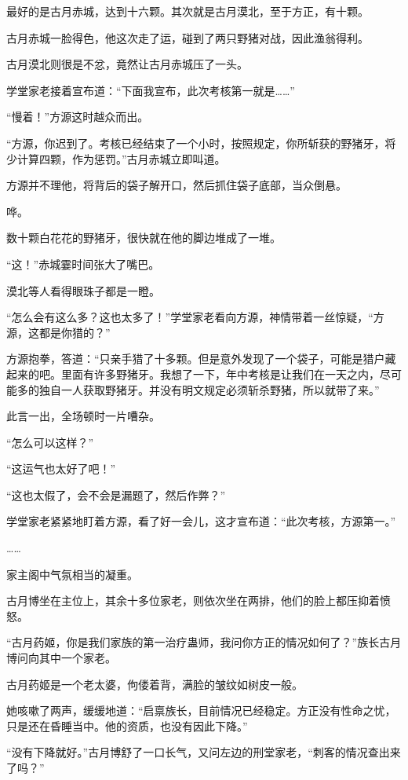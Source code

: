 \begin{this_body}
最好的是古月赤城，达到十六颗。其次就是古月漠北，至于方正，有十颗。

古月赤城一脸得色，他这次走了运，碰到了两只野猪对战，因此渔翁得利。

古月漠北则很是不忿，竟然让古月赤城压了一头。

学堂家老接着宣布道：“下面我宣布，此次考核第一就是……”

“慢着！”方源这时越众而出。

“方源，你迟到了。考核已经结束了一个小时，按照规定，你所斩获的野猪牙，将少计算四颗，作为惩罚。”古月赤城立即叫道。

方源并不理他，将背后的袋子解开口，然后抓住袋子底部，当众倒悬。

哗。

数十颗白花花的野猪牙，很快就在他的脚边堆成了一堆。

“这！”赤城霎时间张大了嘴巴。

漠北等人看得眼珠子都是一瞪。

“怎么会有这么多？这也太多了！”学堂家老看向方源，神情带着一丝惊疑，“方源，这都是你猎的？”

方源抱拳，答道：“只亲手猎了十多颗。但是意外发现了一个袋子，可能是猎户藏起来的吧。里面有许多野猪牙。我想了一下，年中考核是让我们在一天之内，尽可能多的独自一人获取野猪牙。并没有明文规定必须斩杀野猪，所以就带了来。”

此言一出，全场顿时一片嘈杂。

“怎么可以这样？”

“这运气也太好了吧！”

“这也太假了，会不会是漏题了，然后作弊？”

学堂家老紧紧地盯着方源，看了好一会儿，这才宣布道：“此次考核，方源第一。”

……

家主阁中气氛相当的凝重。

古月博坐在主位上，其余十多位家老，则依次坐在两排，他们的脸上都压抑着愤怒。

“古月药姬，你是我们家族的第一治疗蛊师，我问你方正的情况如何了？”族长古月博问向其中一个家老。

古月药姬是一个老太婆，佝偻着背，满脸的皱纹如树皮一般。

她咳嗽了两声，缓缓地道：“启禀族长，目前情况已经稳定。方正没有性命之忧，只是还在昏睡当中。他的资质，也没有因此下降。”

“没有下降就好。”古月博舒了一口长气，又问左边的刑堂家老，“刺客的情况查出来了吗？”


\end{this_body}
